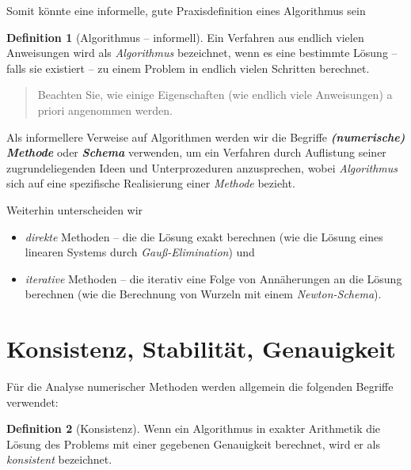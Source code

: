 \documentclass[
]{book}
\providecommand{\tightlist}{%
  \setlength{\itemsep}{0pt}\setlength{\parskip}{0pt}}
\newenvironment {JHSAYS} [0] {\begin{quote}\color{jhsc}} {\end{quote}}
\theoremstyle{definition}
\newtheorem{definition}{Definition}[chapter]
\theoremstyle{definition}
\theoremstyle{definition}
\theoremstyle{definition}
\theoremstyle{remark}
\begin{document}
Somit könnte eine informelle, gute Praxisdefinition eines Algorithmus sein

\begin{definition}[Algorithmus -- informell]
\protect\hypertarget{def:info-algorithm}{}\label{def:info-algorithm}Ein Verfahren aus endlich vielen Anweisungen wird als \emph{Algorithmus} bezeichnet, wenn es eine bestimmte Lösung -- falls sie existiert -- zu einem Problem in endlich vielen Schritten berechnet.
\end{definition}

\leavevmode{}%
\begin{JHSAYS}
Beachten Sie, wie einige Eigenschaften (wie endlich viele Anweisungen) a priori angenommen werden.

\end{JHSAYS}

Als informellere Verweise auf Algorithmen werden wir die Begriffe \textbf{\emph{(numerische) Methode}} oder \textbf{\emph{Schema}} verwenden, um ein Verfahren durch Auflistung seiner zugrundeliegenden Ideen und Unterprozeduren anzusprechen, wobei \emph{Algorithmus} sich auf eine spezifische Realisierung einer \emph{Methode} bezieht.

Weiterhin unterscheiden wir

\begin{itemize}
\tightlist
\item
  \emph{direkte} Methoden -- die die Lösung exakt berechnen (wie die Lösung eines linearen Systems durch \emph{Gauß-Elimination}) und
\item
  \emph{iterative} Methoden -- die iterativ eine Folge von Annäherungen an die Lösung berechnen (wie die Berechnung von Wurzeln mit einem \emph{Newton-Schema}).
\end{itemize}

\hypertarget{konsistenz-stabilituxe4t-genauigkeit}{%
\section{Konsistenz, Stabilität, Genauigkeit}\label{konsistenz-stabilituxe4t-genauigkeit}}

Für die Analyse numerischer Methoden werden allgemein die folgenden Begriffe verwendet:

\begin{definition}[Konsistenz]
\protect\hypertarget{def:consistency}{}\label{def:consistency}Wenn ein Algorithmus in exakter Arithmetik die Lösung des Problems mit einer gegebenen Genauigkeit berechnet, wird er als \emph{konsistent} bezeichnet.
\end{definition}
\end{document}

